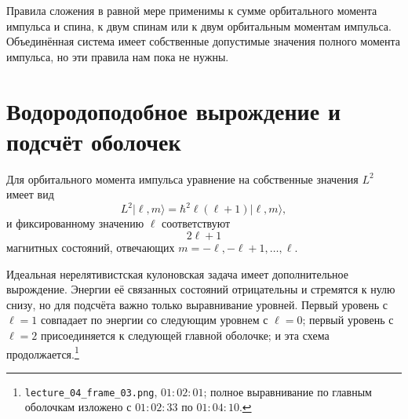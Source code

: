 Правила сложения в равной мере применимы к сумме орбитального момента импульса и спина, к двум спинам или к двум орбитальным моментам импульса. Объединённая система имеет собственные допустимые значения полного момента импульса, но эти правила нам пока не нужны.

\begin{classroomqa}
\end{classroomqa}

\section{Водородоподобное вырождение и подсчёт оболочек}

Для орбитального момента импульса уравнение на собственные значения \(L^{2}\) имеет вид
\begin{equation}
L^{2}\lvert\ell,m\rangle
=\hbar^{2}\ell(\ell+1)\lvert\ell,m\rangle,
\end{equation}
и фиксированному значению \(\ell\) соответствуют
\begin{equation}
2\ell+1
\end{equation}
магнитных состояний, отвечающих \(m=-\ell,-\ell+1,\ldots,\ell\).

Идеальная нерелятивистская кулоновская задача имеет дополнительное вырождение. Энергии её связанных состояний отрицательны и стремятся к нулю снизу, но для подсчёта важно только выравнивание уровней. Первый уровень с \(\ell=1\) совпадает по энергии со следующим уровнем с \(\ell=0\); первый уровень с \(\ell=2\) присоединяется к следующей главной оболочке; и эта схема продолжается.\footnote{\texttt{lecture\_04\_frame\_03.png}, \(01{:}02{:}01\); полное выравнивание по главным оболочкам изложено с \(01{:}02{:}33\) по \(01{:}04{:}10\).}

